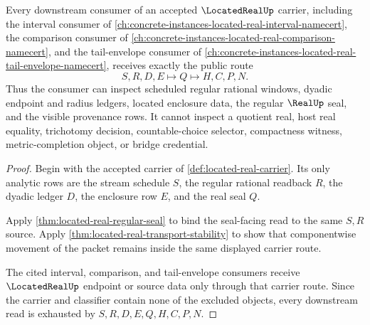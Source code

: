 \begin{theorem}
\label{thm:located-real-public-route}
Every downstream consumer of an accepted $\LocatedRealUp$ carrier, including the interval consumer of \autoref{ch:concrete-instances-located-real-interval-namecert}, the comparison consumer of \autoref{ch:concrete-instances-located-real-comparison-namecert}, and the tail-envelope consumer of \autoref{ch:concrete-instances-located-real-tail-envelope-namecert}, receives exactly the public route
$$
S,R,D,E \longmapsto Q \longmapsto H,C,P,N .
$$
Thus the consumer can inspect scheduled regular rational windows, dyadic endpoint and radius ledgers, located enclosure data, the regular $\RealUp$ seal, and the visible provenance rows. It cannot inspect a quotient real, host real equality, trichotomy decision, countable-choice selector, compactness witness, metric-completion object, or bridge credential.
\end{theorem}
\begin{proof}
Begin with the accepted carrier of \autoref{def:located-real-carrier}. Its only analytic rows are the stream schedule $S$, the regular rational readback $R$, the dyadic ledger $D$, the enclosure row $E$, and the real seal $Q$.

Apply \autoref{thm:located-real-regular-seal} to bind the seal-facing read to the same $S,R$ source. Apply \autoref{thm:located-real-transport-stability} to show that componentwise movement of the packet remains inside the same displayed carrier route.

The cited interval, comparison, and tail-envelope consumers receive $\LocatedRealUp$ endpoint or source data only through that carrier route. Since the carrier and classifier contain none of the excluded objects, every downstream read is exhausted by $S,R,D,E,Q,H,C,P,N$.
\end{proof}

